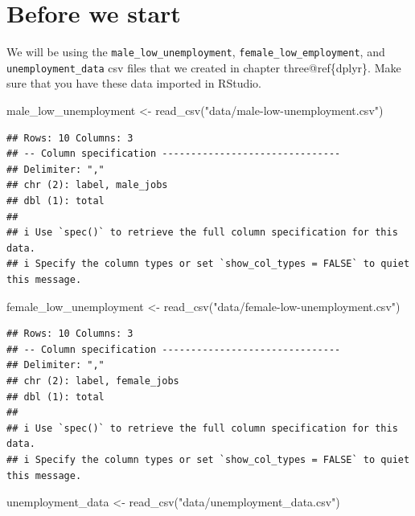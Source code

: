 \documentclass[
  krantz2]{krantz}
\makeatletter
\newenvironment{Shaded}{\begin{snugshade}}{\end{snugshade}}
\newcommand{\FunctionTok}[1]{\textcolor[rgb]{0,0,0}{#1}}
\newcommand{\NormalTok}[1]{#1}
\newcommand{\OtherTok}[1]{\textcolor[rgb]{0.37,0.37,0.37}{#1}}
\newcommand{\StringTok}[1]{\textcolor[rgb]{0.5,0.5,0.5}{#1}}
\newenvironment{kframe}{%
\medskip{}
\setlength{\fboxsep}{.8em}
 \def\at@end@of@kframe{}%
 \ifinner\ifhmode%
  \def\at@end@of@kframe{\end{minipage}}%
  \begin{minipage}{\columnwidth}%
 \fi\fi%
 \def\FrameCommand##1{\hskip\@totalleftmargin \hskip-\fboxsep
 \colorbox{shadecolor}{##1}\hskip-\fboxsep
     \hskip-\linewidth \hskip-\@totalleftmargin \hskip\columnwidth}%
 \MakeFramed {\advance\hsize-\width
   \@totalleftmargin\z@ \linewidth\hsize
   \@setminipage}}%
 {\par\unskip\endMakeFramed%
 \at@end@of@kframe}
\renewenvironment{Shaded}{\begin{kframe}}{\end{kframe}}
\makeatother
\begin{document}
\hypertarget{start-plots}{%
\section{Before we start}\label{start-plots}}

We will be using the \texttt{male\_low\_unemployment}, \texttt{female\_low\_employment}, and \texttt{unemployment\_data} csv files that we created in chapter three@ref\{dplyr\}. Make sure that you have these data imported in RStudio.

\begin{Shaded}
\begin{Highlighting}[]
\NormalTok{male\_low\_unemployment }\OtherTok{\textless{}{-}} \FunctionTok{read\_csv}\NormalTok{(}\StringTok{"data/male{-}low{-}unemployment.csv"}\NormalTok{)}
\end{Highlighting}
\end{Shaded}

\begin{verbatim}
## Rows: 10 Columns: 3
## -- Column specification -------------------------------
## Delimiter: ","
## chr (2): label, male_jobs
## dbl (1): total
##
## i Use `spec()` to retrieve the full column specification for this data.
## i Specify the column types or set `show_col_types = FALSE` to quiet this message.
\end{verbatim}

\begin{Shaded}
\begin{Highlighting}[]
\NormalTok{female\_low\_unemployment }\OtherTok{\textless{}{-}} \FunctionTok{read\_csv}\NormalTok{(}\StringTok{"data/female{-}low{-}unemployment.csv"}\NormalTok{)}
\end{Highlighting}
\end{Shaded}

\begin{verbatim}
## Rows: 10 Columns: 3
## -- Column specification -------------------------------
## Delimiter: ","
## chr (2): label, female_jobs
## dbl (1): total
##
## i Use `spec()` to retrieve the full column specification for this data.
## i Specify the column types or set `show_col_types = FALSE` to quiet this message.
\end{verbatim}

\begin{Shaded}
\begin{Highlighting}[]
\NormalTok{unemployment\_data }\OtherTok{\textless{}{-}} \FunctionTok{read\_csv}\NormalTok{(}\StringTok{"data/unemployment\_data.csv"}\NormalTok{)}
\end{Highlighting}
\end{Shaded}
\end{document}

